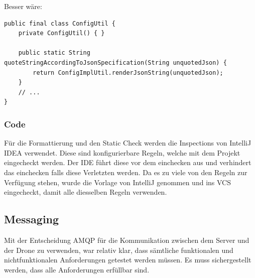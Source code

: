 Besser wäre:
\begin{lstlisting}
public final class ConfigUtil {
    private ConfigUtil() { }

    public static String quoteStringAccordingToJsonSpecification(String unquotedJson) {
        return ConfigImplUtil.renderJsonString(unquotedJson);
    }
    // ...
}
\end{lstlisting}

\subsubsection{Code}
Für die Formattierung und den Static Check werden die Inspections von IntelliJ IDEA verwendet.
Diese sind konfigurierbare Regeln, welche mit dem Projekt eingecheckt werden. Der IDE führt diese vor dem einchecken aus und verhindert das einchecken falls diese Verletzten werden.
Da es zu viele von den Regeln zur Verfügung stehen, wurde die Vorlage von IntelliJ genommen und ins VCS eingecheckt, damit alle diesselben Regeln verwenden.

\subsection{Messaging}

Mit der Entscheidung AMQP für die Kommunikation zwischen dem Server und der Drone zu verwenden, war relativ klar, dass sämtliche funktionalen und nichtfunktionalen Anforderungen getestet werden müssen. Es muss sichergestellt werden, dass alle Anforderungen erfüllbar sind.


